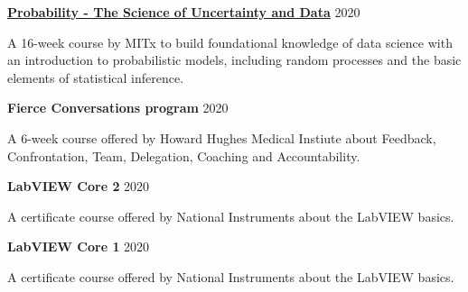 \documentclass[margin,line]{res}
\begin{document}
\begin{resume}
\vspace*{-2mm}

{\bf \href{https://www.edx.org/course/probability-the-science-of-uncertainty-and-data}{Probability - The Science of Uncertainty and Data}} \hfill {2020}\\
\vspace*{-3.5mm}
\begin{addmargin}[0pt]{.1\linewidth}
\vspace*{-1mm}
A 16-week course by MITx to build foundational knowledge of data science with an introduction to probabilistic models, including random processes and the basic elements of statistical inference.
\end{addmargin}

\vspace*{-2mm}

{\bf Fierce Conversations program} \hfill {2020}\\
\vspace*{-3.5mm}
\begin{addmargin}[0pt]{.1\linewidth}
\vspace*{-1mm}
A 6-week course offered by Howard Hughes Medical Instiute about Feedback, Confrontation, Team, Delegation, Coaching and Accountability.
\end{addmargin}

\vspace*{-2mm}

{\bf LabVIEW Core 2} \hfill {2020}\\
\vspace*{-3.5mm}
\begin{addmargin}[0pt]{.1\linewidth}
\vspace*{-1mm}
A certificate course offered by National Instruments about the LabVIEW basics.
\end{addmargin}

\vspace*{-2mm}

{\bf LabVIEW Core 1} \hfill {2020}\\
\vspace*{-3.5mm}
\begin{addmargin}[0pt]{.1\linewidth}
\vspace*{-1mm}
A certificate course offered by National Instruments about the LabVIEW basics.
\end{addmargin}

\vspace*{-2mm}


\end{resume}
\end{document}
